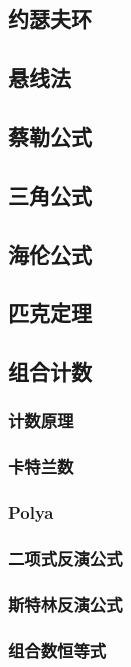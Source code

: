\documentclass[twocolumn,a4]{article}
\newcommand{\addcpp}[1]{}
\begin{document}
	\subsection{约瑟夫环}
	\subsection{悬线法}
	\subsection{蔡勒公式}
	\subsection{三角公式}
	\subsection{海伦公式}
	\subsection{匹克定理}
	\subsection{组合计数}
		\subsubsection{计数原理}
		\subsubsection{卡特兰数}
		\subsubsection{Polya}
		\subsubsection{二项式反演公式}
		\subsubsection{斯特林反演公式}
		\subsubsection{组合数恒等式}
			
\end{document}
